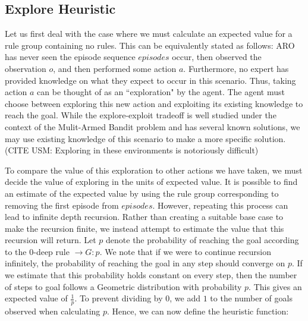 \documentclass[letterpaper]{article} %
\begin{document}
\subsection{Explore Heuristic}
Let us first deal with the case where we must calculate an expected value for a rule group containing no rules. This can be equivalently stated as follows: ARO has never seen the episode sequence $episodes$ occur, then observed the observation $o$, and then performed some action $a$. Furthermore, no expert has provided knowledge on what they expect to occur in this scenario. Thus, taking action $a$ can be thought of as an ``exploration" by the agent. The agent must choose between exploring this new action and exploiting its existing knowledge to reach the goal. While the explore-exploit tradeoff is well studied under the context of the Mulit-Armed Bandit problem and has several known solutions, we may use existing knowledge of this scenario to make a more specific solution. (CITE USM: Exploring in these environments is notoriously difficult) 

To compare the value of this exploration to other actions we have taken, we must decide the value of exploring in the units of expected value.  It is possible to find an estimate of the expected value by using the rule group corresponding to removing the first episode from $episodes$. However, repeating this process can lead to infinite depth recursion. Rather than creating a suitable base case to make the recursion finite, we instead attempt to estimate the value that this recursion will return. Let $p$ denote the probability of reaching the goal according to the $0$-deep rule $\rightarrow G : p$. We note that if we were to continue recursion infinitely, the probability of reaching the goal in any step should converge on $p$. If we estimate that this probability holds constant on every step, then the number of steps to goal follows a Geometric distribution with probability $p$. This gives an expected value of $\frac{1}{p}$. To prevent dividing by $0$, we add $1$ to the number of goals observed when calculating $p$. Hence, we can now define the heuristic function:
\end{document}
